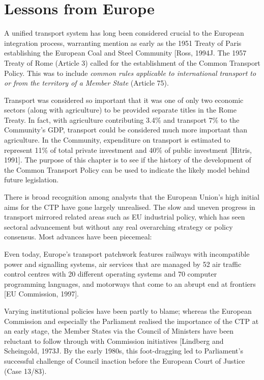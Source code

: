 \chapter{Lessons from Europe}

A unified transport system has long been considered crucial to the European integration process, warranting mention as early as the 1951 Treaty of Paris establishing the European Coal and Steel Community [Ross, 1994J. The 1957 Treaty of Rome (Article 3) called for the establishment of the Common Transport Policy. This was to include \textit{common rules applicable to international transport to or from the territory of a Member State} (Article 75).

Transport was considered so important that it was one of only two economic sectors (along with agriculture) to be provided separate titles in the Rome Treaty. In fact, with agriculture contributing 3.4\% and transport 7\% to the Community's GDP, transport could be considered much more important than agriculture. In the Community, expenditure on transport is estimated to represent 11\% of total private investment and 40\% of public investment [Hitris, 1991]. The purpose of this chapter is to see if the history of the development of the Common Transport Policy can be used to indicate the likely model behind future legislation.

There is broad recognition among analysts that the European Union's high initial aims for the CTP have gone largely unrealised. The slow and uneven progress in transport mirrored related areas such as EU industrial policy, which has seen sectoral advancement but without any real overarching strategy or policy consensus. Most advances have been piecemeal:

\begin{displayquote}
Even today, Europe's transport patchwork features railways with incompatible power and signalling systems, air services that are managed by 52 air traffic control centres with 20 different operating systems and 70 computer programming languages, and motorways that come to an abrupt end at frontiers [EU Commission, 1997].
\end{displayquote}

Varying institutional policies have been partly to blame; whereas the European Commission and especially the Parliament realised the importance of the CTP at an early stage, the Member States via the Council of Ministers have been reluctant to follow through with Commission initiatives [Lindberg and Scheingold, 1973J. By the early 1980s, this foot-dragging led to Parliament's successful challenge of Council inaction before the European Court of Justice (Case 13/83).

